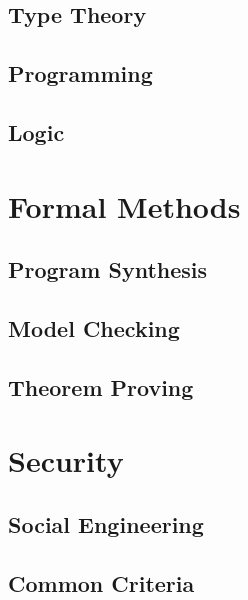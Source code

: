 \documentclass{book}
\begin{document}
  \chapter{Type Theory}\label{sec:sd:typetheory}
  

  \chapter{Programming}\label{sec:sd:program}
  

  \chapter{Logic}\label{sec:sd:logic}
  
  
\part{Formal Methods}

  \chapter{Program Synthesis} 

  \chapter{Model Checking} 
    

  \chapter{Theorem Proving} 
   

\part{Security}

  \chapter{Social Engineering}

  \chapter{Common Criteria}
\end{document}
